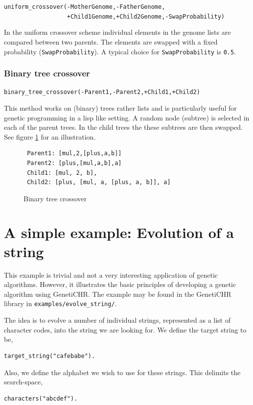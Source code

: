 \documentclass{article}
\begin{document}
\verb|uniform_crossover(-MotherGenome,-FatherGenome,|\\
\verb|                  +Child1Genome,+Child2Genome,-SwapProbability)|
\medskip

In the uniform crossover scheme individual elements in the genome lists are compared between two parents. The elements are swapped with a fixed probability (\verb|SwapProbability|). A typical choice
for \verb|SwapProbability| is \verb|0.5|.

\subsubsection{Binary tree crossover}

\verb|binary_tree_crossover(-Parent1,-Parent2,+Child1,+Child2)|

This method works on (binary) trees rather lists and is particularly useful for genetic programming in a lisp like setting. A random node (subtree) is selected in each of the parent trees. In the child trees the 
these subtrees are then swapped. See figure \ref{fig:binary_tree_crossover} for an illustration.

\begin{figure}[htb]
\caption{Binary tree crossover}
\label{fig:binary_tree_crossover}
\begin{verbatim}
 Parent1: [mul,2,[plus,a,b]]
 Parent2: [plus,[mul,a,b],a]
 Child1: [mul, 2, b],
 Child2: [plus, [mul, a, [plus, a, b]], a]
\end{verbatim}
\end{figure}

\section{A simple example: Evolution of a string}

This example is trivial and not a very interesting application of genetic algorithms. However, it illustrates the basic principles of developing
a genetic algorithm using GenetiCHR. The example may be found in the GenetiCHR library in \verb|examples/evolve_string/|.

The idea is to evolve a number of individual strings, represented as a list of character codes, into the string we are looking for. We define the 
target string to be, 
\begin{verbatim}
target_string("cafebabe").
\end{verbatim}

Also, we define the alphabet we wish to use for these strings. This delimits the search-space,
\begin{verbatim}
characters("abcdef").
\end{verbatim}
\end{document}
